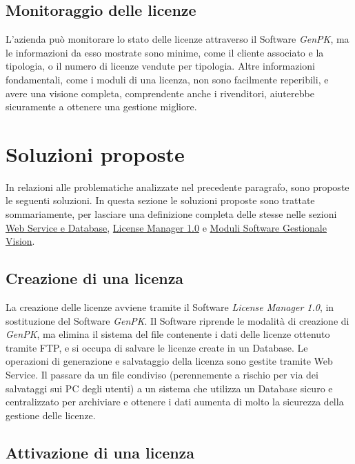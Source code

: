 \subsection{Monitoraggio delle licenze}
L'azienda può monitorare lo stato delle licenze attraverso il Software \textit{GenPK}, ma le informazioni da esso mostrate sono minime, come il cliente associato e la tipologia, o il numero di licenze vendute per tipologia. Altre informazioni fondamentali, come i moduli di una licenza, non sono facilmente reperibili, e avere una visione completa, comprendente anche i rivenditori, aiuterebbe sicuramente a ottenere una gestione migliore.



\section{Soluzioni proposte}

In relazioni alle problematiche analizzate nel precedente paragrafo, sono proposte le seguenti soluzioni. In questa sezione le soluzioni proposte sono trattate sommariamente, per lasciare una definizione completa delle stesse nelle sezioni {\hyperref[cap:sviluppo-software]{Web Service e Database}}, {\hyperref[cap:license-manager]{License Manager 1.0}} e {\hyperref[cap:moduli-vision]{Moduli Software Gestionale Vision}}.

\subsection{Creazione di una licenza}

La creazione delle licenze avviene tramite il Software \textit{License Manager 1.0}, in sostituzione del Software \textit{GenPK}. Il Software riprende le modalità di creazione di \textit{GenPK}, ma elimina il sistema del file contenente i dati delle licenze ottenuto tramite FTP, e si occupa di salvare le licenze create in un Database. Le operazioni di generazione e salvataggio della  licenza sono gestite tramite Web Service. 
Il passare da un file condiviso (perennemente a rischio per via dei salvataggi sui PC degli utenti) a un sistema che utilizza un Database sicuro e centralizzato per archiviare e ottenere i dati aumenta di molto la sicurezza della gestione delle licenze.

\subsection{Attivazione di una licenza}

